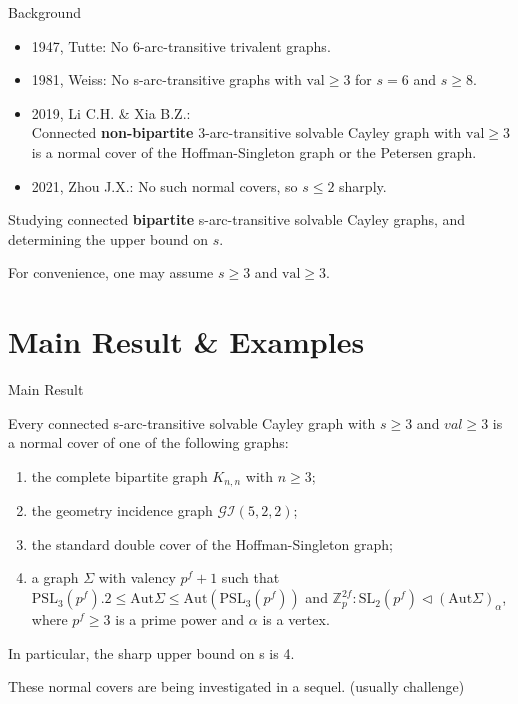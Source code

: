 \documentclass{beamer}
\def\SL{\mathrm{SL}}
\def\PSL{\mathrm{PSL}}
\def\Aut{\mathrm{Aut}}
\def\val{\mathrm{val}}
\begin{document}
\begin{frame}{Background}
\begin{itemize}
	\item 1947, Tutte: No 6-arc-transitive trivalent graphs.
	\item 1981, Weiss: No s-arc-transitive graphs with $\val\geq 3$ for $s=6$ and $s\geq 8$.
	\item 2019, Li C.H. \& Xia B.Z.: \\ Connected \textbf{non-bipartite} 3-arc-transitive solvable Cayley graph with $\val\geq 3$ is a normal cover of the Hoffman-Singleton graph or the Petersen graph.
	\item 2021, Zhou J.X.: No such normal covers, so $s\leq 2$ sharply.
\end{itemize}

\begin{problem}
Studying connected \textbf{bipartite} s-arc-transitive solvable Cayley graphs, and determining the upper bound on $s$.	
\end{problem}
For convenience, one may assume $s\geq 3$ and $\val\geq 3$. 

\end{frame}




\section{Main Result \& Examples}
\begin{frame}{Main Result}
\begin{theorem}
Every connected s-arc-transitive solvable Cayley graph with $s\geq 3$ and $val\geq 3$ is a normal cover of one of the following graphs:	
\begin{enumerate}
	\item the complete bipartite graph $K_{n,n}$ with $n\geq 3$;
	\item the geometry incidence graph $\mathcal{GI}(5, 2, 2)$;
	\item the standard double cover of the Hoffman-Singleton graph;
	\item a graph $\Sigma$ with valency $p^f+1$ such that $\PSL_3(p^f).2\leq \Aut\Sigma\leq \Aut(\PSL_3(p^f))$ and $\mathbb{Z}_p^{2f}:\SL_2(p^f)\triangleleft(\Aut\Sigma)_\alpha$, where $p^f\geq 3$ is a prime power and $\alpha$ is a vertex.
\end{enumerate}
In particular, the sharp upper bound on s is 4.
\end{theorem}
These normal covers are being investigated in a sequel. (usually challenge)
\end{frame}
\end{document}
